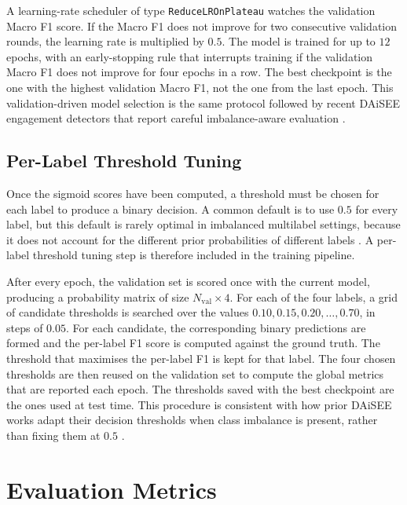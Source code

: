A learning-rate scheduler of type \texttt{ReduceLROnPlateau} watches the validation Macro F1 score. If the Macro F1 does not improve for two consecutive validation rounds, the learning rate is multiplied by $0.5$. The model is trained for up to $12$ epochs, with an early-stopping rule that interrupts training if the validation Macro F1 does not improve for four epochs in a row. The best checkpoint is the one with the highest validation Macro F1, not the one from the last epoch. This validation-driven model selection is the same protocol followed by recent DAiSEE engagement detectors that report careful imbalance-aware evaluation \cite{abedi_improving_2021,shiri_detection_2024,su_leveraging_2024}.

\subsection{Per-Label Threshold Tuning}\label{sec:method_thresholds}

Once the sigmoid scores have been computed, a threshold must be chosen for each label to produce a binary decision. A common default is to use $0.5$ for every label, but this default is rarely optimal in imbalanced multilabel settings, because it does not account for the different prior probabilities of different labels \cite{rianto_engagement_2025}. A per-label threshold tuning step is therefore included in the training pipeline.

After every epoch, the validation set is scored once with the current model, producing a probability matrix of size $N_{\mathrm{val}} \times 4$. For each of the four labels, a grid of candidate thresholds is searched over the values $0.10, 0.15, 0.20, \dots, 0.70$, in steps of $0.05$. For each candidate, the corresponding binary predictions are formed and the per-label F1 score is computed against the ground truth. The threshold that maximises the per-label F1 is kept for that label. The four chosen thresholds are then reused on the validation set to compute the global metrics that are reported each epoch. The thresholds saved with the best checkpoint are the ones used at test time. This procedure is consistent with how prior DAiSEE works adapt their decision thresholds when class imbalance is present, rather than fixing them at $0.5$ \cite{rianto_engagement_2025,mehta_three-dimensional_2022}.

\section{Evaluation Metrics}\label{sec:method_metrics}

